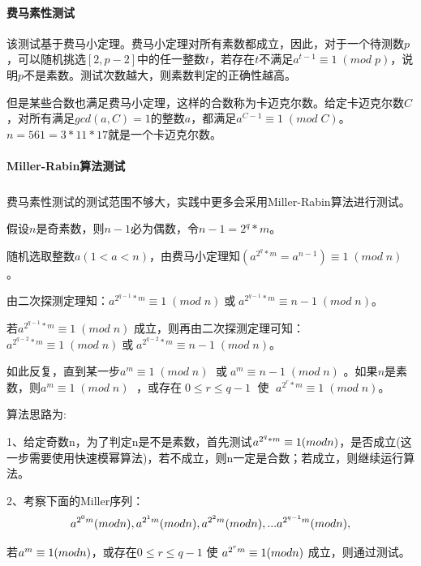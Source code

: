 \documentclass[UTF8,a4paper,10.5pt,twocolumn]{ctexart}
\newcommand{\upcite}[1]{\textsuperscript{\textsuperscript{\cite{#1}}}}
\begin{document}
\paragraph{费马素性测试}
	\indent \;
	\par 该测试基于费马小定理。费马小定理对所有素数都成立，因此，对于一个待测数$p$，可以随机挑选$[2,p-2]$中的任一整数$t$，若存在$t$不满足$a^{t-1}\equiv 1 \;(mod \; p)$，说明$p$不是素数。测试次数越大，则素数判定的正确性越高。

	\par 但是某些合数也满足费马小定理，这样的合数称为卡迈克尔数。给定卡迈克尔数$C$，对所有满足$gcd(a,C)=1$的整数$a$，都满足$a^{C-1}\equiv 1\; (mod\; C)$。$n=561=3*11*17$就是一个卡迈克尔数。

\paragraph{Miller-Rabin算法测试}
	\indent \;
	\par 费马素性测试的测试范围不够大，实践中更多会采用Miller-Rabin算法进行测试\upcite{4}。
	\par 假设$n$是奇素数，则$n-1$必为偶数，令$n-1=2^q*m$。
	\par 随机选取整数$a(1<a<n)$，由费马小定理知$(a^{2^{q}*m}=a^{n-1})\equiv1\; (mod \; n)$ 。
	\par 由二次探测定理知：$a^{2^{q-1}*m}\equiv 1\; (mod\; n)\;$或$\; a^{2^{q-1}*m}\equiv n-1\; (mod\; n)$。
	\par 若$a^{2^{q-1}*m}\equiv 1\; (mod\; n)$ 成立，则再由二次探测定理可知：$a^{2^{q-2}*m}\equiv 1\; (mod\; n)\;$或$\; a^{2^{q-2}*m}\equiv n-1\; (mod\; n)$。
	\par 如此反复，直到某一步$a^{m}\equiv 1\; (mod \; n)\;$ 或$\; a^{m}\equiv n-1\; (mod \; n)$ 。如果$n$是素数，则$a^m\equiv 1\; (mod \; n)\;$ ，或存在$\; 0\leq r\leq q-1 \;$ 使 $\; a^{2^{r}*m}\equiv 1\; (mod\; n)$。 \\
	\indent \;
	\par 算法思路为:
	\par 1、给定奇数n，为了判定n是不是素数，首先测试$a^{2^{q}*m}\equiv1\space (mod \space n)$，是否成立(这一步需要使用快速模幂算法)，若不成立，则n一定是合数；若成立，则继续运行算法。
	\par 2、考察下面的Miller序列：
	$$
		a^{2^{0}m}(mod\space n),a^{2^{1}m}(mod\space n),a^{2^{2}m}(mod\space n),...a^{2^{q-1}m}(mod\space n),
	$$
	\par 若$a^{m}\equiv 1\space(mod \space n)$，或存在$0\leq r\leq q-1$ 使 $a^{2^{r}m}\equiv 1\space (mod\space n)$ 成立，则通过测试。 \\
	
\end{document}

